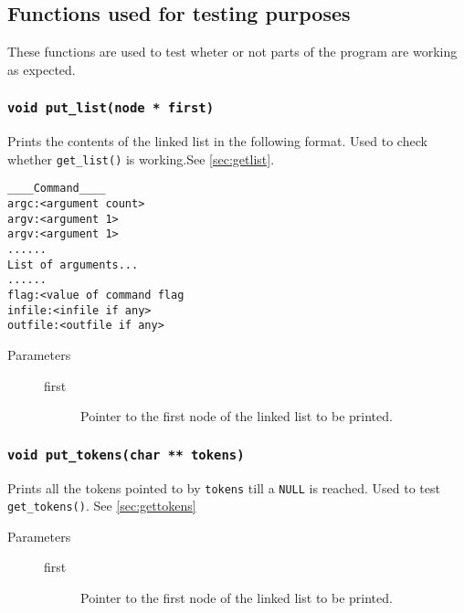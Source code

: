 \documentclass{article}
\begin{document}
\subsection{Functions used for testing purposes}
These functions are used to test wheter or not parts of the program are working as expected.

\subsubsection{\lstinline{void put_list(node * first)}}
Prints the contents of the linked list in the following format. Used to check whether \lstinline{get_list()} is working.See \ref{sec:getlist}.
\begin{lstlisting}
____Command____
argc:<argument count>
argv:<argument 1>
argv:<argument 1>
......
List of arguments...
......
flag:<value of command flag
infile:<infile if any>
outfile:<outfile if any>
\end{lstlisting}
\begin{description}
	\item[Parameters]\hfill
	\begin{description}
		\item[first] Pointer to the first node of the linked list to be printed.
	\end{description}
\end{description}

\subsubsection{\lstinline{void put_tokens(char ** tokens)}}
Prints all the tokens pointed to by \lstinline{tokens} till a \lstinline{NULL} is reached. Used to test \lstinline{get_tokens()}. See \ref{sec:gettokens}
\begin{description}
	\item[Parameters]\hfill
	\begin{description}
		\item[first] Pointer to the first node of the linked list to be printed.
	\end{description}
\end{description}




\end{document}
